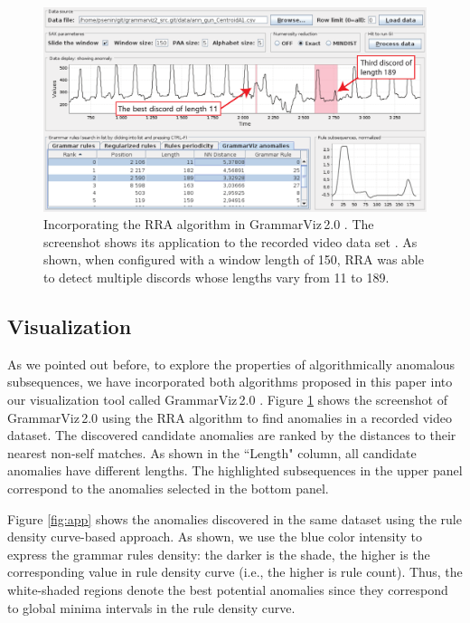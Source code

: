 \documentclass{sig-alternate}
\begin{document}
\begin{figure}[t]
   \centering
   \includegraphics[width=\textwidth]{VideoData2.pdf}
   \caption{Incorporating the RRA algorithm in GrammarViz\,2.0 \cite{grammarviz2}. The screenshot shows its application to the recorded video data set \cite{param_free}. As shown, when configured with a window length of 150, RRA was able to detect multiple discords whose lengths vary from 11 to 189.}
   \label{fig:app2}
\end{figure}



\subsection{Visualization}
As we pointed out before, to explore the properties of algorithmically anomalous subsequences, we have incorporated both algorithms proposed in this paper into our visualization tool called GrammarViz\,2.0 \cite{grammarviz2}. Figure \ref{fig:app2} shows the screenshot of GrammarViz\,2.0 using the RRA algorithm to find anomalies in a recorded video dataset. The discovered candidate anomalies are ranked by the distances to their nearest non-self matches. As shown in the ``Length" column, all candidate anomalies have different lengths. The highlighted subsequences in the upper panel correspond to the anomalies selected in the bottom panel.

Figure \ref{fig:app} shows the anomalies discovered in the same dataset using the rule density curve-based approach. As shown, we use the blue color intensity to express the grammar rules density: the darker is the shade, the higher is the corresponding value in rule density curve (i.e., the higher is rule count). Thus, the white-shaded regions denote the best potential anomalies since they correspond to global minima intervals in the rule density curve. 
\end{document}
